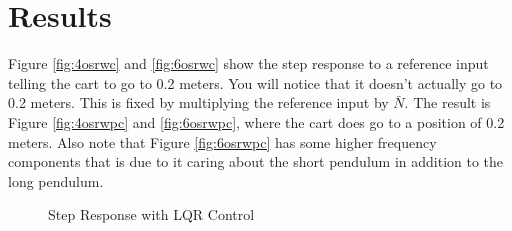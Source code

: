 \documentclass{article}
\begin{document}
\section{Results}

Figure \ref{fig:4osrwc} and \ref{fig:6osrwc} show the step response to a reference input telling the cart to go to 0.2 meters. You will notice that it doesn't actually go to 0.2 meters. This is fixed by multiplying the reference input by $\bar{N}$. The result is Figure \ref{fig:4osrwpc} and \ref{fig:6osrwpc}, where the cart does go to a position of 0.2 meters. Also note that Figure \ref{fig:6osrwpc} has some higher frequency components that is due to it caring about the short pendulum in addition to the long pendulum.

\begin{figure}
\centering
{}
\caption{Step Response with LQR Control}
\end{figure}
\end{document}
